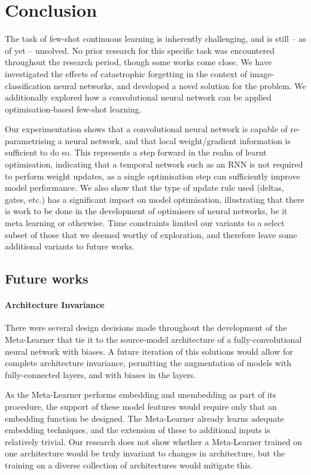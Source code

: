 \documentclass{report}
\begin{document}
\chapter{Conclusion}
The task of few-shot continuous learning is inherently challenging, and is still -- as of yet -- unsolved. No prior research for this specific task was encountered throughout the research period, though some works come close. We have investigated the effects of catastrophic forgetting in the context of image-classification neural networks, and developed a novel solution for the problem. We additionally explored how a convolutional neural network can be applied optimisation-based few-shot learning. \par
Our experimentation shows that a convolutional neural network is capable of re-parametrising a neural network, and that local weight/gradient information is sufficient to do so. This represents a step forward in the realm of learnt optimisation, indicating that a temporal network such as an RNN is not required to perform weight updates, as a single optimisation step can sufficiently improve model performance. We also show that the type of update rule used (deltas, gates, etc.) has a significant impact on model optimisation, illustrating that there is work to be done in the development of optimisers of neural networks, be it meta learning or otherwise. Time constraints limited our variants to a select subset of those that we deemed worthy of exploration, and therefore leave some additional variants to future works.

\section{Future works} \label{future-works}
\subsubsection{Architecture Invariance}
There were several design decisions made throughout the development of the Meta-Learner that tie it to the source-model architecture of a fully-convolutional neural network with biases. A future iteration of this solutions would allow for complete architecture invariance, permitting the augmentation of models with fully-connected layers, and with biases in the layers. \par
As the Meta-Learner performs embedding and unembedding as part of its procedure, the support of these model features would require only that an embedding function be designed. The Meta-Learner already learns adequate embedding techniques, and the extension of these to additional inputs is relatively trivial. Our research does not show whether a Meta-Learner trained on one architecture would be truly invariant to changes in architecture, but the training on a diverse collection of architectures would mitigate this.
\end{document}

